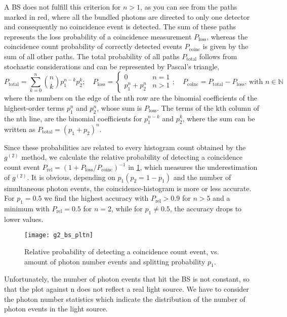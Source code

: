 A \ac{BS} does not fulfill this criterion for $n>1$, as you can see from the paths marked in red, where all the bundled photons are directed to only one detector and consequently no coincidence event is detected. The sum of these paths represents the loss probability of a coincidence measurement $P_\mathrm{loss}$, whereas the coincidence count probability of correctly detected events $P_\mathrm{coinc}$ is given by the sum of all other paths. The total probability of all paths $P_\mathrm{total}$ follows from stochastic considerations and can be represented by Pascal's triangle,
\begin{equation}\label{eq:treediagram}
	P_\mathrm{total}=\sum_{k=0}^n \binom{n}{k}p_1^{n-k}p_2^k;\quad P_\mathrm{loss}=\begin{cases}0 & n=1\\p_1^n+p_2^n& n>1\end{cases};\quad P_\mathrm{coinc}=P_\mathrm{total}-P_\mathrm{loss}\textrm{, with }n\in\mathbb{N} 
\end{equation}
where the numbers on the edge of the nth row are the binomial coefficients of the highest-order terms $p_1^n$ and $p_2^n$, whose sum is $P_\mathrm{loss}$. The terms of the kth column of the nth line, are the binomial coefficients for $p_1^{n-k}$ and $p_2^k$, where the sum can be written as $P_\mathrm{total}=(p_1+p_2)^n$.

Since these probabilities are related to every histogram count obtained by the $g^{(2)}$ method, we calculate the relative probability of detecting a coincidence count event $P_\mathrm{rel}=(1+P_\mathrm{loss}/P_\mathrm{coinc})^{-1}$ in \cref{fig:pltn}, which measures the underestimation of $g^{(2)}$. It is obvious, depending on $p_1 (p_2=1-p_1)$ and the number of simultaneous photon events, the coincidence-histogram is more or less accurate. For $p_1=0.5$ we find the highest accuracy with $P_\mathrm{rel}>0.9$ for $n>5$ and a minimum with $P_\mathrm{rel}=0.5$ for $n=2$, while for $p_1\neq 0.5$, the accuracy drops to lower values.
\begin{figure}[ht]
	\centering
	\texttt{[image: g2\_bs\_pltn]}
	\caption{Relative probability of detecting a coincidence count event, vs. amount of photon number events and splitting probability $p_1$.}
	\label{fig:pltn}
\end{figure}
\noindent Unfortunately, the number of photon events that hit the \ac{BS} is not constant, so that the plot against n does not reflect a real light source. We have to consider the photon number statistics which indicate the distribution of the number of photon events in the light source.

